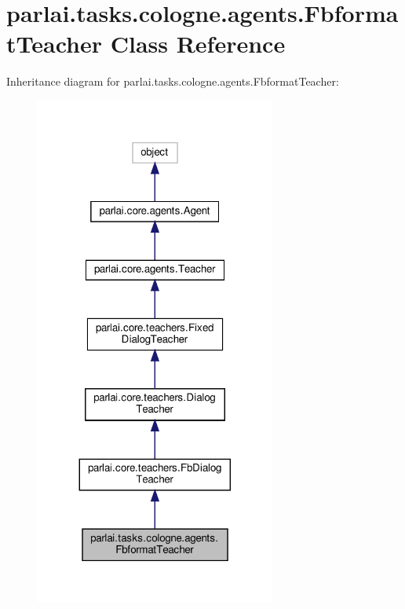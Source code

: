 \hypertarget{classparlai_1_1tasks_1_1cologne_1_1agents_1_1FbformatTeacher}{}\section{parlai.\+tasks.\+cologne.\+agents.\+Fbformat\+Teacher Class Reference}
\label{classparlai_1_1tasks_1_1cologne_1_1agents_1_1FbformatTeacher}


Inheritance diagram for parlai.\+tasks.\+cologne.\+agents.\+Fbformat\+Teacher\+:
\nopagebreak
\begin{figure}[H]
\begin{center}
\leavevmode
\includegraphics[width=224pt]{d6/dfe/classparlai_1_1tasks_1_1cologne_1_1agents_1_1FbformatTeacher__inherit__graph}
\end{center}
\end{figure}


